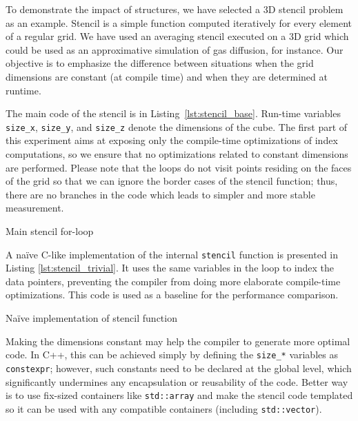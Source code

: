 To demonstrate the impact of \Noarr{} structures, we have selected a 3D stencil problem as an example. Stencil is a simple function computed iteratively for every element of a regular grid. We have used an averaging stencil executed on a 3D grid which could be used as an approximative simulation of gas diffusion, for instance. Our objective is to emphasize the difference between situations when the grid dimensions are constant (at compile time) and when they are determined at runtime.

The main code of the stencil is in Listing~\ref{lst:stencil_base}. Run-time variables \texttt{size\_x}, \texttt{size\_y}, and \texttt{size\_z} denote the dimensions of the cube. The first part of this experiment aims at exposing only the compile-time optimizations of index computations, so we ensure that no optimizations related to constant dimensions are performed. Please note that the loops do not visit points residing on the faces of the grid so that we can ignore the border cases of the stencil function; thus, there are no branches in the code which leads to simpler and more stable measurement. 

\begin{listing}[h]
    \vspace{-10pt}
    \vspace{-20pt}
    \caption{Main stencil for-loop}
    \label{lst:stencil_base}
\end{listing}

A na\"{i}ve C-like implementation of the internal \texttt{stencil} function is presented in Listing \ref{lst:stencil_trivial}. It uses the same variables in the loop to index the data pointers, preventing the compiler from doing more elaborate compile-time optimizations. This code is used as a baseline for the performance comparison.

\begin{listing}[h]
    \vspace{-10pt}
    \vspace{-20pt}
    \caption{Na\"{i}ve implementation of stencil function}
    \label{lst:stencil_trivial}
\end{listing}
\vspace{-10pt}

Making the dimensions constant may help the compiler to generate more optimal code. In C++, this can be achieved simply by defining the \texttt{size\_*} variables as \texttt{constexpr}; however, such constants need to be declared at the global level, which significantly undermines any encapsulation or reusability of the code. Better way is to use fix-sized containers like \texttt{std::array} and make the stencil code templated so it can be used with any compatible containers (including \texttt{std::vector}).

